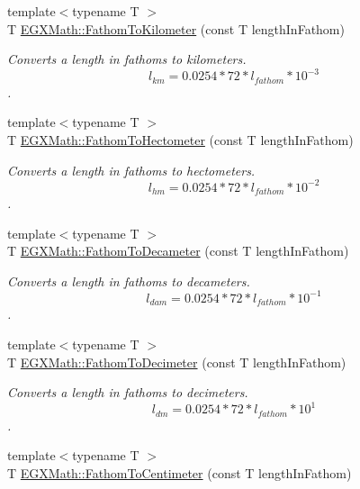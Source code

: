 \begin{DoxyCompactItemize}
{\footnotesize template$<$typename T $>$ }\\T \mbox{\hyperlink{group___e_g_x_math-_conversions-_length_conversions-_imperial-_fathom-_s_i_gaa94789483238000a82b01720546e84d7}{E\+G\+X\+Math\+::\+Fathom\+To\+Kilometer}} (const T length\+In\+Fathom)
\begin{DoxyCompactList}\small\item\em Converts a length in fathoms to kilometers. \[ l_{km}=0.0254 * 72 * l_{fathom} * 10^{-3} \]. \end{DoxyCompactList}\item 
{\footnotesize template$<$typename T $>$ }\\T \mbox{\hyperlink{group___e_g_x_math-_conversions-_length_conversions-_imperial-_fathom-_s_i_ga2667f0d80cdd5d547a9a5bc0f1220768}{E\+G\+X\+Math\+::\+Fathom\+To\+Hectometer}} (const T length\+In\+Fathom)
\begin{DoxyCompactList}\small\item\em Converts a length in fathoms to hectometers. \[ l_{hm}=0.0254 * 72 * l_{fathom} * 10^{-2} \]. \end{DoxyCompactList}\item 
{\footnotesize template$<$typename T $>$ }\\T \mbox{\hyperlink{group___e_g_x_math-_conversions-_length_conversions-_imperial-_fathom-_s_i_ga58364998b467b74922de64f4e2f92825}{E\+G\+X\+Math\+::\+Fathom\+To\+Decameter}} (const T length\+In\+Fathom)
\begin{DoxyCompactList}\small\item\em Converts a length in fathoms to decameters. \[ l_{dam}=0.0254 * 72 * l_{fathom} * 10^{-1} \]. \end{DoxyCompactList}\item 
{\footnotesize template$<$typename T $>$ }\\T \mbox{\hyperlink{group___e_g_x_math-_conversions-_length_conversions-_imperial-_fathom-_s_i_gaceb060a2b2455c407eacabd842fa4b59}{E\+G\+X\+Math\+::\+Fathom\+To\+Decimeter}} (const T length\+In\+Fathom)
\begin{DoxyCompactList}\small\item\em Converts a length in fathoms to decimeters. \[ l_{dm}=0.0254 * 72 * l_{fathom} * 10^{1} \]. \end{DoxyCompactList}\item 
{\footnotesize template$<$typename T $>$ }\\T \mbox{\hyperlink{group___e_g_x_math-_conversions-_length_conversions-_imperial-_fathom-_s_i_ga3995ded9e8a94c2d7059dd148954b46c}{E\+G\+X\+Math\+::\+Fathom\+To\+Centimeter}} (const T length\+In\+Fathom)

\end{DoxyCompactItemize}
